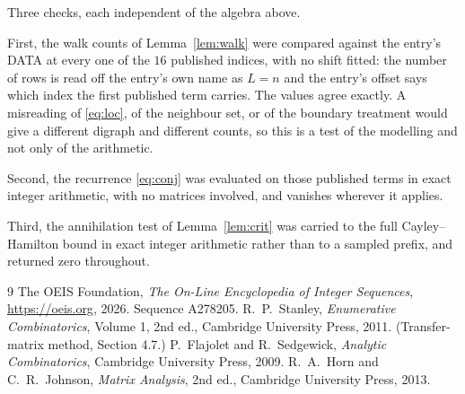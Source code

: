 \documentclass[11pt,a4paper]{article}
\theoremstyle{plain}
\theoremstyle{definition}
\begin{document}
Three checks, each independent of the algebra above.

First, the walk counts of Lemma~\ref{lem:walk} were compared against the entry's DATA at
every one of the $16$ published indices, with no shift fitted: the number of rows is
read off the entry's own name as $L=n$ and the entry's offset says which index the first
published term carries. The values agree exactly. A misreading of \eqref{eq:loc}, of the
neighbour set, or of the boundary treatment would give a different digraph and different
counts, so this is a test of the modelling and not only of the arithmetic.

Second, the recurrence \eqref{eq:conj} was evaluated on those published terms in exact
integer arithmetic, with no matrices involved, and vanishes wherever it applies.

Third, the annihilation test of Lemma~\ref{lem:crit} was carried to the full
Cayley--Hamilton bound in exact integer arithmetic rather than to a sampled prefix, and
returned zero throughout.

\begin{thebibliography}{9}
 The OEIS Foundation, \emph{The On-Line Encyclopedia of Integer
Sequences}, \url{https://oeis.org}, 2026. Sequence A278205.
 R.~P.~Stanley, \emph{Enumerative Combinatorics}, Volume 1, 2nd ed.,
Cambridge University Press, 2011. (Transfer-matrix method, Section 4.7.)
 P.~Flajolet and R.~Sedgewick, \emph{Analytic Combinatorics}, Cambridge
University Press, 2009.
 R.~A.~Horn and C.~R.~Johnson, \emph{Matrix Analysis}, 2nd ed., Cambridge
University Press, 2013.
\end{thebibliography}
\end{document}
